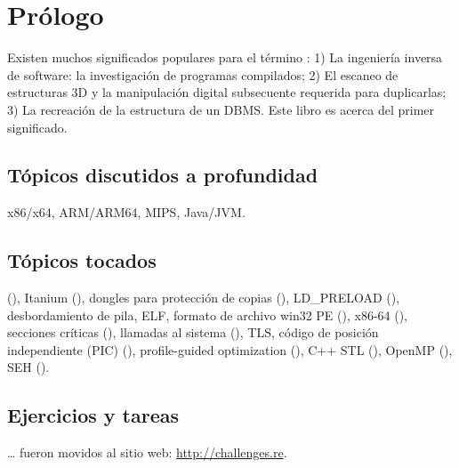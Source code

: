\section*{Pr\'ologo}

Existen muchos significados populares para el t\'ermino :
1) La ingenier\'ia inversa de software: la investigaci\'on de programas compilados;
2) El escaneo de estructuras 3D y la manipulaci\'on digital subsecuente requerida para duplicarlas;
3) La recreaci\'on de la estructura de un \ac{DBMS}.
Este libro es acerca del primer significado.

\subsection*{T\'opicos discutidos a profundidad}

x86/x64, ARM/ARM64, MIPS, Java/JVM.

\subsection*{T\'opicos tocados}

\oracle (),
Itanium (),
dongles para protecci\'on de copias (), 
LD\_PRELOAD (),
desbordamiento de pila,
\ac{ELF},
formato de archivo win32 PE
(),
x86-64 (),
secciones cr\'iticas
(),
llamadas al sistema
(), 
\ac{TLS},
c\'odigo de posici\'on independiente
(\ac{PIC}) (), 
profile-guided optimization (),
C++ STL (),
OpenMP (),
SEH ().

\subsection*{Ejercicios y tareas}

\dots 
fueron movidos al sitio web: \url{http://challenges.re}.

